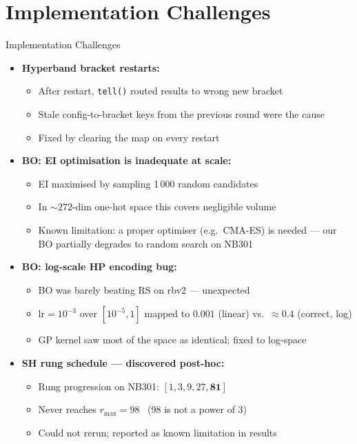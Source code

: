 \documentclass[t,english]{beamer}
\begin{document}
\section{Implementation Challenges}

\begin{frame}{Implementation Challenges}
  \begin{itemize}[<+->]
    \item \textbf{Hyperband bracket restarts:}
      \begin{itemize}
        \item After restart, \texttt{tell()} routed results to wrong new bracket
        \item Stale config-to-bracket keys from the previous round were the cause
        \item Fixed by clearing the map on every restart
      \end{itemize}

    \item \textbf{BO: EI optimisation is inadequate at scale:}
      \begin{itemize}
        \item EI maximised by sampling 1\,000 random candidates
        \item In ${\sim}272$-dim one-hot space this covers negligible volume
        \item \alert{Known limitation:} a proper optimiser (e.g.\ CMA-ES)
              is needed — our BO partially degrades to random search on NB301
      \end{itemize}

    \item \textbf{BO: log-scale HP encoding bug:}
      \begin{itemize}
        \item BO was barely beating RS on rbv2 — unexpected
        \item $\mathrm{lr}{=}10^{-3}$ over $[10^{-5},1]$
              mapped to $0.001$ (linear) vs.\ ${\approx}0.4$ (correct, log)
        \item GP kernel saw most of the space as identical; fixed to log-space
      \end{itemize}

    \item \textbf{SH rung schedule — discovered post-hoc:}
      \begin{itemize}
        \item Rung progression on NB301: $[1,3,9,27,\mathbf{81}]$
        \item Never reaches $r_{\max}{=}98$ \ (98 is not a power of 3)
        \item Could not rerun; reported as known limitation in results
      \end{itemize}
  \end{itemize}
\end{frame}
\end{document}
